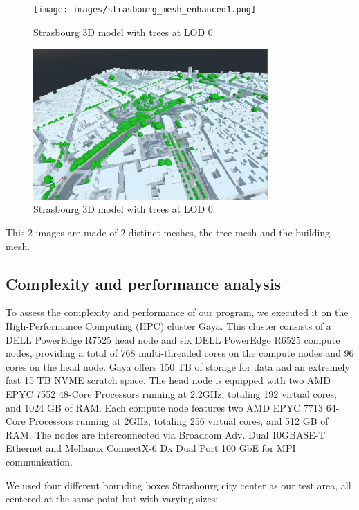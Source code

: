 \documentclass[12pt]{article}
\begin{document}
\begin{figure}[H]
    \centering
    \texttt{[image: images/strasbourg\_mesh\_enhanced1.png]}
    \caption{Strasbourg 3D model with trees at LOD 0}
\end{figure}

\begin{figure}[H]
    \centering
    \includegraphics[width=0.8\textwidth]{images/strasbourg_mesh_enhanced2.png}
    \caption{Strasbourg 3D model with trees at LOD 0}
\end{figure}

This 2 images are made of 2 distinct meshes, the tree mesh and the building mesh.

\subsection{Complexity and performance analysis}

To assess the complexity and performance of our program, we executed it on
the High-Performance Computing (HPC) cluster Gaya. This cluster consists of a
DELL PowerEdge R7525 head node and six DELL PowerEdge R6525 compute nodes,
providing a total of 768 multi-threaded cores on the compute nodes and 96 cores
on the head node. Gaya offers 150 TB of storage for data and an extremely fast
15 TB NVME scratch space. The head node is equipped with two AMD EPYC 7552
48-Core Processors running at 2.2GHz, totaling 192 virtual cores, and 1024
GB of RAM. Each compute node features two AMD EPYC 7713 64-Core Processors
running at 2GHz, totaling 256 virtual cores, and 512 GB of RAM.
The nodes are interconnected via Broadcom Adv. Dual 10GBASE-T Ethernet and
Mellanox ConnectX-6 Dx Dual Port 100 GbE for MPI communication.

We used four different bounding boxes Strasbourg city center as our test area, all centered at the same point but with
varying sizes:
\end{document}
